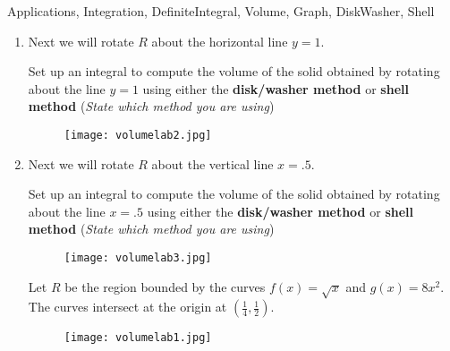 \begin{tagblock}{Applications, Integration, DefiniteIntegral, Volume, Graph, DiskWasher, Shell}
\begin{question}
\begin{enumerate}
\begin{enumerate}
\item Set up an integral to compute the volume of the solid obtained by rotating about the $y$-axis using the \textbf{disk/washer method}.
\vspace{1in}
\item Set up an integral to compute the volume of the solid obtained by rotating about the $y$-axis using the \textbf{shell method}.
\vspace{.8in}
\end{enumerate}




\item Next we will  rotate $R$ about the horizontal line $y=1$. 

 Set up an integral to compute the volume of the solid obtained by rotating about the line $y=1$ using either the \textbf{disk/washer method} or  \textbf{shell method} (\emph{State which method you are using})
\begin{figure}[h]
\texttt{[image: volumelab2.jpg]}
\end{figure}

\vspace{.8in}

\item Next we will rotate $R$ about the vertical line $x=.5$. 

 Set up an integral to compute the volume of the solid obtained by rotating about the line $x=.5$ using either the \textbf{disk/washer method} or  \textbf{shell method} (\emph{State which method you are using})
\begin{figure}[h]
\texttt{[image: volumelab3.jpg]}
\end{figure}

Let $R$ be the region bounded by the curves $f(x) =\sqrt{x}$ and $g(x) = 8x^2$.  The curves intersect at the origin at $(\frac{1}{4}, \frac{1}{2})$.   

\begin{figure}[h]
\centering
\texttt{[image: volumelab1.jpg]}
\end{figure}





\end{enumerate}
\end{question}
\end{tagblock}
